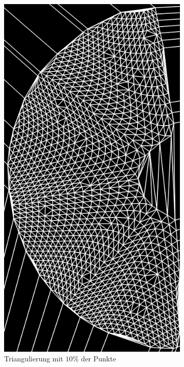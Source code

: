 \begin{figure}[!htb]
	\centering
	\begin{subfigure}{.9\textwidth}
		\centering
		\includegraphics[angle=-90, width=.8\textwidth]{images/delaunay1.png}
		\caption{Triangulierung mit $10\%$ der Punkte}
	\end{subfigure}
	\begin{subfigure}{.9\textwidth}
		\centering

\end{subfigure}
\end{figure}
